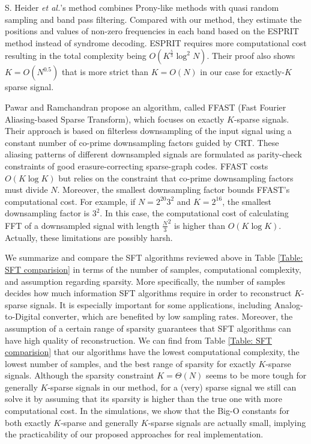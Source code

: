 \documentclass[journal,onecolumn,11pt]{IEEEtran}
\begin{document}
S. Heider {\em et al.}'s method \cite{Heider2013} combines Prony-like methods with quasi random sampling and band pass filtering.
Compared with our method, they estimate the positions and values of non-zero frequencies in each band based on the ESPRIT method instead of syndrome decoding.
ESPRIT requires more computational cost resulting in the total complexity being $O(K^{\frac{5}{3}} \log^{2} N)$.
Their proof also shows $K=O(N^{0.5})$ that is more strict than $K=O(N)$ in our case for exactly-$K$ sparse signal.

Pawar and Ramchandran \cite{Pawar2013} propose an algorithm, called FFAST (Fast Fourier Aliasing-based Sparse Transform), which focuses on exactly $K$-sparse signals.
Their approach is based on filterless downsampling of the input signal using a constant number of co-prime downsampling factors guided by CRT.
These aliasing patterns of different downsampled signals are formulated as parity-check constraints of good erasure-correcting sparse-graph codes.
FFAST costs $O(K \log K)$ but relies on the constraint that co-prime downsampling factors must divide $N$.
Moreover, the smallest downsampling factor bounds FFAST's computational cost.
For example, if $N=2^{20}3^{2}$ and $K=2^{16}$, the smallest downsampling factor is $3^{2}$.
In this case, the computational cost of calculating FFT of a downsampled signal with length $\frac{N}{3}^{2}$ is higher than $O(K \log K)$.
Actually, these limitations are possibly harsh.


We summarize and compare the SFT algorithms reviewed above in Table \ref{Table: SFT comparision} in terms of the number of samples, computational complexity, and assumption regarding sparsity.
More specifically, the number of samples decides how much information SFT algorithms require in order to reconstruct $K$-sparse signals.
It is especially important for some applications, including Analog-to-Digital converter, which are benefited by low sampling rates.
Moreover, the assumption of a certain range of sparsity guarantees that SFT algorithms can have high quality of reconstruction.
We can find from Table \ref{Table: SFT comparision} that our algorithms have the lowest computational complexity, the lowest number of samples, and the best range of sparsity for exactly $K$-sparse signals.
Although the sparsity constraint $K=\Theta(N)$ seems to be more tough for generally $K$-sparse signals in our method,
for a (very) sparse signal we still can solve it by assuming that its sparsity is higher than the true one with more computational cost.
In the simulations, we show that the Big-O constants for both exactly $K$-sparse and generally $K$-sparse signals are actually small, implying the practicability of our proposed approaches for real implementation.
\end{document}
